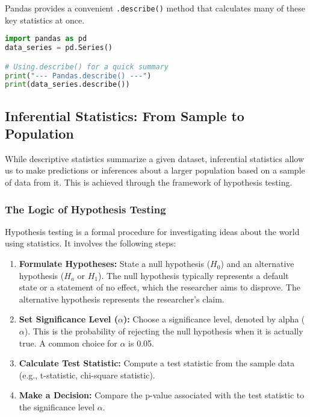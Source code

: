 \documentclass[11pt,a4paper]{article}
\begin{document}
Pandas provides a convenient \texttt{.describe()} method that calculates many of these key statistics at once.

\begin{lstlisting}[language=Python, caption=Measures of Variability]
import pandas as pd
data_series = pd.Series()

# Using.describe() for a quick summary
print("--- Pandas.describe() ---")
print(data_series.describe())
\end{lstlisting}

\subsection{Inferential Statistics: From Sample to Population}

While descriptive statistics summarize a given dataset, inferential statistics allow us to make predictions or inferences about a larger population based on a sample of data from it. This is achieved through the framework of hypothesis testing.

\subsubsection{The Logic of Hypothesis Testing}

Hypothesis testing is a formal procedure for investigating ideas about the world using statistics. It involves the following steps:
\begin{enumerate}
    \item \textbf{Formulate Hypotheses:} State a null hypothesis ($H_{0}$) and an alternative hypothesis ($H_{a}$ or $H_{1}$). The null hypothesis typically represents a default state or a statement of no effect, which the researcher aims to disprove. The alternative hypothesis represents the researcher's claim.
    \item \textbf{Set Significance Level ($\alpha$):} Choose a significance level, denoted by alpha ($\alpha$). This is the probability of rejecting the null hypothesis when it is actually true. A common choice for $\alpha$ is 0.05.
    \item \textbf{Calculate Test Statistic:} Compute a test statistic from the sample data (e.g., t-statistic, chi-square statistic).
    \item \textbf{Make a Decision:} Compare the p-value associated with the test statistic to the significance level $\alpha$.
\end{enumerate}
\end{document}

